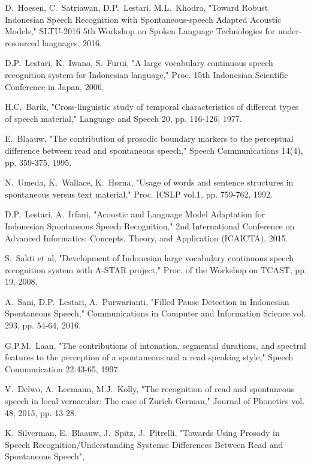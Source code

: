 \documentclass[conference]{IEEEtran}
\begin{document}
\begin{thebibliography}{1}

D.~Hoesen, C.~Satriawan, D.P.~Lestari, M.L.~Khodra,
    "Toward Robust Indonesian Speech Recognition with Spontaneous-speech Adapted Acoustic Models,"
    SLTU-2016 5th Workshop on Spoken Language Technologies for under-resourced languages, 2016.

D.P.~Lestari, K.~Iwano, S.~Furui,
    "A large vocabulary continuous speech recognition system for Indonesian language,"
    Proc. 15th Indonesian Scientific Conference in Japan, 2006.

H.C.~Barik, 
    "Cross-linguistic study of temporal characteristics of different types of speech material,"
    Language and Speech 20, pp. 116-126, 1977.

E.~Blaauw,
    "The contribution of prosodic boundary markers to the perceptual difference between read and spontaneous speech,"
    Speech Communications 14(4), pp. 359-375, 1995.

N.~Umeda, K.~Wallace, K.~Horna,
    "Usage of words and sentence structures in spontaneous versus text material,"
    Proc. ICSLP vol.1, pp. 759-762, 1992.

D.P.~Lestari, A.~Irfani,
    "Acoustic and Language Model Adaptation for Indonesian Spontaneous Speech Recognition,"
    2nd International Conference on Advanced Informatics: Concepts, Theory, and Application (ICAICTA), 2015.

S.~Sakti et al,
    "Development of Indonesian large vocabulary continuous speech recognition system with A-STAR project,"
    Proc. of the Workshop on TCAST, pp. 19, 2008.

A.~Sani, D.P.~Lestari, A.~Purwarianti,
    "Filled Pause Detection in Indonesian Spontaneous Speech,"
    Communications in Computer and Information Science vol. 293, pp. 54-64, 2016.

G.P.M.~Laan,
    "The contributions of intonation, segmental durations, and spectral features to the perception of a spontaneous and a read speaking style,"
    Speech Communication 22:43-65, 1997.

V.~Delwo, A.~Leemann, M.J.~Kolly,
    "The recognition of read and spontaneous speech in local vernacular: The case of Zurich German,"
    Journal of Phonetics vol. 48, 2015, pp. 13-28.

K.~Silverman, E.~Blaauw, J.~Spitz, J.~Pitrelli,
    "Towards Using Prosody in Speech Recognition/Understanding Systems: Differences Between Read and Spontaneous Speech",


\end{thebibliography}
\end{document}
